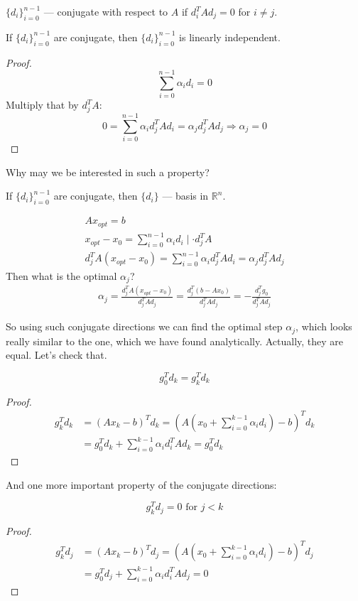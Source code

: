 \begin{conj}
    $\{d_i\}^{n-1}_{i=0}$ --- conjugate with respect  to $A$ if $d_i^T A d_j = 0$ for $i \neq j$.
\end{conj}

\begin{theorem}
    If $\{d_i\}^{n-1}_{i=0}$ are conjugate, then $\{d_i\}^{n-1}_{i=0}$ is linearly independent.
\end{theorem}
\begin{proof}
    \[
        \sum^{n-1}_{i=0} \alpha_i d_i = 0 
    \]
    Multiply that by $d_j^T A$:
    \[
        0 = \sum^{n-1}_{i=0} \alpha_i d_j^T A d_i = \alpha_j d_j^T A d_j \Longrightarrow \alpha_j = 0
    \]
\end{proof}

Why may we be interested in such a property?

If $\{d_i\}^{n-1}_{i=0}$ are conjugate, then $\{d_i\}$ --- basis in $\mathbb{R}^n$.

\begin{gather*}
    A x_{opt} = b \\ 
    x_{opt} - x_0 = \sum^{n-1}_{i=0} \alpha_i d_i \mid \cdot d_j^T A \\
    d_j^T A (x_{opt} - x_0) = \sum^{n-1}_{i=0} \alpha_i d_j^T A d_i = \alpha_j d_j^T A d_j
\end{gather*}
Then what is the optimal $\alpha_j$?
\begin{gather*}
    \alpha_j = \frac{d_j^T A (x_{opt} - x_0)}{d_j^T A d_j} = \frac{d_j^T (b - A x_0)}{d_j^T A d_j} = - \frac{d_j^T g_0}{d_j^T A d_j}
\end{gather*}

So using such conjugate directions we can find the optimal step $\alpha_j$, which looks really similar to the one, which we have found analytically. Actually, they are equal. Let's check that. 

\begin{theorem}
    \[
        g_0^T d_k = g_k^T d_k
    \]
\end{theorem}
\begin{proof}
    \begin{align*}
        g_k^T d_k &= (A x_k - b)^T d_k = (A (x_0 + \sum^{k-1}_{i=0} \alpha_i d_i) - b)^T d_k \\
        &= g_0^T d_k + \sum^{k-1}_{i=0} \alpha_i d_i^T A d_k = g_0^T d_k
    \end{align*}
\end{proof}

And one more important property of the conjugate directions:
\begin{theorem}
    \[
        g_k^T d_j = 0 \text{ for } j < k
    \]
\end{theorem}
\begin{proof}
    \begin{align*}
        g_k^T d_j &= (A x_k - b)^T d_j = (A (x_0 + \sum^{k-1}_{i=0} \alpha_i d_i) - b)^T d_j \\
        &= g_0^T d_j + \sum^{k-1}_{i=0} \alpha_i d_i^T A d_j = 0
    \end{align*}
\end{proof}


